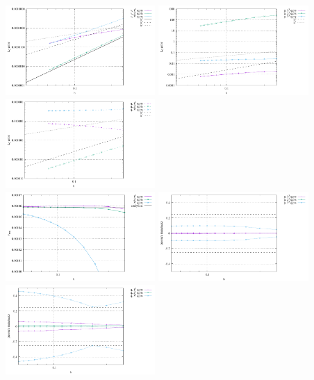 \begin{center}
\includegraphics[width=5.7cm]{python_codes/fieldstone_10/resultsQ2/exp6/errv}
\includegraphics[width=5.7cm]{python_codes/fieldstone_10/resultsQ2/exp6/errp}
\includegraphics[width=5.7cm]{python_codes/fieldstone_10/resultsQ2/exp6/errq}\\
\includegraphics[width=5.7cm]{python_codes/fieldstone_10/resultsQ2/exp6/vrms}
\includegraphics[width=5.7cm]{python_codes/fieldstone_10/resultsQ2/exp6/p_stats}
\includegraphics[width=5.7cm]{python_codes/fieldstone_10/resultsQ2/exp6/q_stats}
\end{center}

